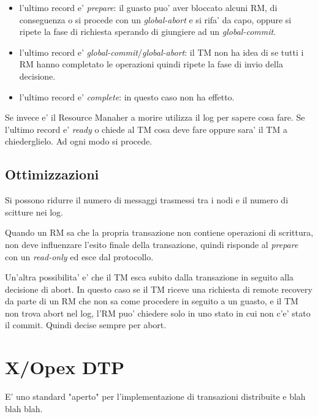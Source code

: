 \begin{itemize}
  \item l'ultimo record e' \textit{prepare}: il guasto puo' aver bloccato alcuni RM, di conseguenza o si procede con un \textit{global-abort} e si rifa' da capo, oppure si ripete la fase di richiesta sperando di giungiere ad un \textit{global-commit}.
  \item l'ultimo record e' \textit{global-commit}/\textit{global-abort}: il TM non ha idea di se tutti i RM hanno completato le operazioni quindi ripete la fase di invio della decisione.
  \item l'ultimo record e' \textit{complete}: in questo caso non ha effetto.
\end{itemize}

Se invece e' il Resource Manaher a morire utilizza il log per sapere cosa fare. Se l'ultimo record e' \textit{ready} o chiede al TM cosa deve fare oppure sara' il TM a chiederglielo. Ad ogni modo si procede.

\subsection{Ottimizzazioni}

Si possono ridurre il numero di messaggi trasmessi tra i nodi e il numero di scitture nei log.

Quando un RM sa che la propria transazione non contiene operazioni di scrittura, non deve influenzare l'esito finale della transazione, quindi risponde al \textit{prepare} con un \textit{read-only} ed esce dal protocollo.

Un'altra possibilita' e' che il TM esca subito dalla transazione in seguito alla decisione di abort.
In questo caso se il TM riceve una richiesta di remote recovery da parte di un RM che non sa come procedere in seguito a un guasto, e il TM non trova abort nel log, l'RM puo' chiedere solo in uno stato in cui non c'e' stato il commit. Quindi decise sempre per abort.

\section{X/Opex DTP}

E' uno standard "aperto" per l'implementazione di transazioni distribuite e blah blah blah.

